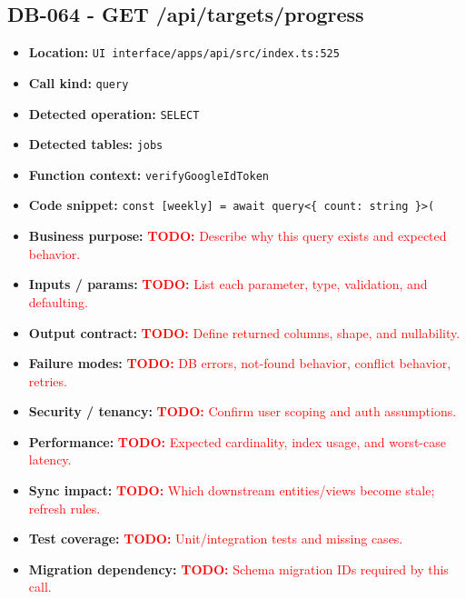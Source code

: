 \documentclass[11pt]{article}
\newcommand{\todoitem}[1]{\textcolor{red}{\textbf{TODO:} #1}}
\begin{document}
\subsection{DB-064 - GET /api/targets/progress}
\begin{itemize}[leftmargin=1.5em]
\item \textbf{Location:} \texttt{UI interface/apps/api/src/index.ts:525}
\item \textbf{Call kind:} \texttt{query}
\item \textbf{Detected operation:} \texttt{SELECT}
\item \textbf{Detected tables:} \texttt{jobs}
\item \textbf{Function context:} \texttt{verifyGoogleIdToken}
\item \textbf{Code snippet:} \texttt{const [weekly] = await query<\{ count: string \}>(}
\item \textbf{Business purpose:} \todoitem{Describe why this query exists and expected behavior.}
\item \textbf{Inputs / params:} \todoitem{List each parameter, type, validation, and defaulting.}
\item \textbf{Output contract:} \todoitem{Define returned columns, shape, and nullability.}
\item \textbf{Failure modes:} \todoitem{DB errors, not-found behavior, conflict behavior, retries.}
\item \textbf{Security / tenancy:} \todoitem{Confirm user scoping and auth assumptions.}
\item \textbf{Performance:} \todoitem{Expected cardinality, index usage, and worst-case latency.}
\item \textbf{Sync impact:} \todoitem{Which downstream entities/views become stale; refresh rules.}
\item \textbf{Test coverage:} \todoitem{Unit/integration tests and missing cases.}
\item \textbf{Migration dependency:} \todoitem{Schema migration IDs required by this call.}
\end{itemize}
\end{document}
